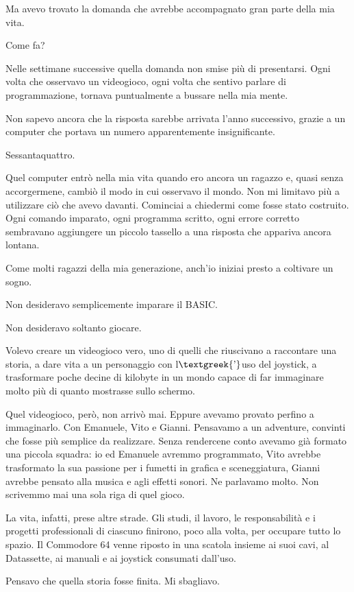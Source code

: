 \documentclass{article}
\begin{document}
Ma avevo trovato la domanda che avrebbe accompagnato gran parte della mia vita.

Come fa?

Nelle settimane successive quella domanda non smise più di presentarsi. Ogni volta che osservavo un videogioco, ogni
volta che sentivo parlare di programmazione, tornava puntualmente a bussare nella mia mente.

Non sapevo ancora che la risposta sarebbe arrivata l'anno successivo, grazie a un computer che portava un numero
apparentemente insignificante.

Sessantaquattro.

Quel computer entrò nella mia vita quando ero ancora un ragazzo e, quasi senza accorgermene, cambiò il modo in cui
osservavo il mondo. Non mi limitavo più a utilizzare ciò che avevo davanti. Cominciai a chiedermi come fosse stato
costruito. Ogni comando imparato, ogni programma scritto, ogni errore corretto sembravano aggiungere un piccolo
tassello a una risposta che appariva ancora lontana.

Come molti ragazzi della mia generazione, anch'io iniziai presto a coltivare un sogno.

Non desideravo semplicemente imparare il BASIC.

Non desideravo soltanto giocare.

Volevo creare un videogioco vero, uno di quelli che riuscivano a raccontare una storia, a dare vita a un personaggio con
l$\text{\textgreek{’}}$uso del joystick, a trasformare poche decine di kilobyte in un mondo capace di far immaginare
molto più di quanto mostrasse sullo schermo.

Quel videogioco, però, non arrivò mai. Eppure avevamo provato perfino a immaginarlo. Con Emanuele, Vito e Gianni.
Pensavamo a un adventure, convinti che fosse più semplice da realizzare. Senza rendercene conto avevamo già formato una
piccola squadra: io ed Emanuele avremmo programmato, Vito avrebbe trasformato la sua passione per i fumetti in grafica
e sceneggiatura, Gianni avrebbe pensato alla musica e agli effetti sonori. Ne parlavamo molto. Non scrivemmo mai una
sola riga di quel gioco.

La vita, infatti, prese altre strade. Gli studi, il lavoro, le responsabilità e i progetti professionali di ciascuno
finirono, poco alla volta, per occupare tutto lo spazio. Il Commodore 64 venne riposto in una scatola insieme ai suoi
cavi, al Datassette, ai manuali e ai joystick consumati dall'uso.

Pensavo che quella storia fosse finita. Mi sbagliavo.
\end{document}
